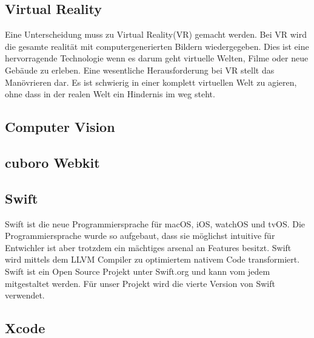 \subsection{Virtual Reality}
Eine Unterscheidung muss zu Virtual Reality(VR) gemacht werden. Bei VR wird die gesamte realität mit computergenerierten Bildern wiedergegeben. Dies ist eine hervorragende Technologie wenn es darum geht virtuelle Welten, Filme oder neue Gebäude zu erleben. Eine wesentliche Herausforderung bei VR stellt das Manövrieren dar. Es ist schwierig in einer komplett virtuellen Welt zu agieren, ohne dass in der realen Welt ein Hindernis im weg steht.

\subsection{Computer Vision}


\subsection{cuboro Webkit}

\subsection{Swift}
Swift ist die neue Programmiersprache für macOS, iOS, watchOS und tvOS. Die Programmiersprache wurde so aufgebaut, dass sie möglichst intuitive für Entwichler ist aber trotzdem ein mächtiges arsenal an Features besitzt. Swift wird mittels dem LLVM Compiler zu optimiertem nativem Code transformiert. Swift ist ein Open Source Projekt unter Swift.org und kann vom jedem mitgestaltet werden. Für unser Projekt wird die vierte Version von Swift verwendet.


\subsection{Xcode}
